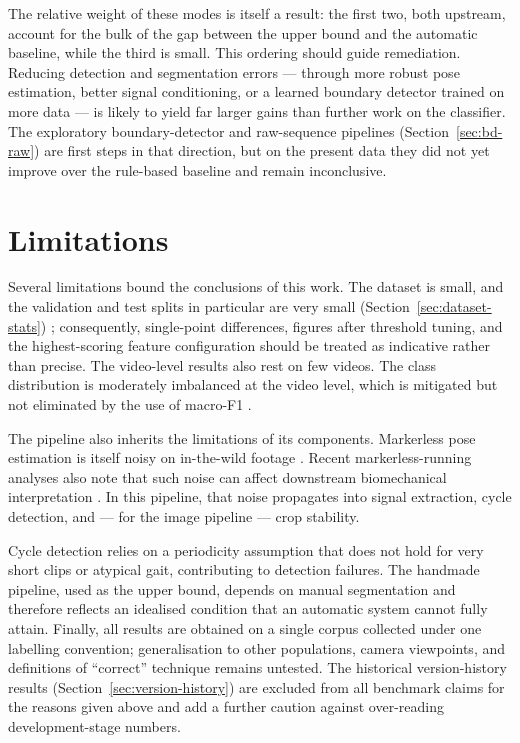 The relative weight of these modes is itself a result: the first two,
both upstream, account for the bulk of the gap between the upper bound and the
automatic baseline, while the third is small. This ordering should guide
remediation. Reducing detection and segmentation errors --- through more robust
pose estimation, better signal conditioning, or a learned boundary detector
trained on more data --- is likely to yield far larger gains than further work
on the classifier. The exploratory boundary-detector and raw-sequence pipelines
(Section~\ref{sec:bd-raw}) are first steps in that direction, but on the present
data they did not yet improve over the rule-based baseline and remain
inconclusive.

\section{Limitations}
\label{sec:disc-limitations}

Several limitations bound the conclusions of this work. The dataset is small,
and the validation and test splits in particular are very small
(Section~\ref{sec:dataset-stats}) ; consequently, single-point differences,
figures after threshold tuning, and the highest-scoring feature configuration
should be treated as indicative rather than precise. The video-level results
also rest on few videos. The class distribution is moderately imbalanced at the
video level, which is mitigated but not eliminated by the use of macro-F1
\cite{sokolova2009metrics}.

The pipeline also inherits the limitations of its components. Markerless pose
estimation is itself noisy on in-the-wild footage \cite{bazarevsky2020blazepose}.
Recent markerless-running analyses also note that such noise can affect
downstream biomechanical interpretation \cite{panconi2024markerless}. In this
pipeline, that noise propagates into signal extraction, cycle detection, and
--- for the image pipeline --- crop stability. 

Cycle detection relies on a
periodicity assumption that does not hold for very short clips or atypical gait,
contributing to detection failures. The handmade pipeline, used as the upper
bound, depends on manual segmentation and therefore reflects an idealised
condition that an automatic system cannot fully attain. Finally, all results
are obtained on a single corpus collected under one labelling convention;
generalisation to other populations, camera viewpoints, and definitions of
``correct'' technique remains untested. The historical version-history results
(Section~\ref{sec:version-history}) are excluded from all benchmark claims for
the reasons given above and add a further caution against over-reading
development-stage numbers.

